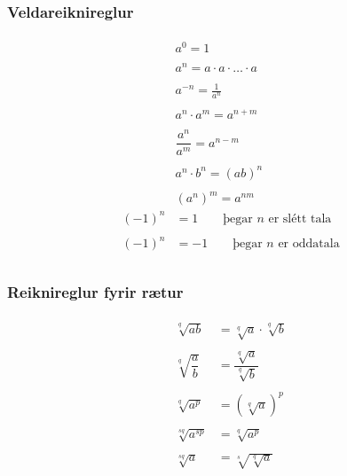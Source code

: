 \documentclass[a4paper,10pt,icelandic]{sphinxmanual}
\begin{document}
\subsubsection{Veldareiknireglur}
\label{\detokenize{Kafli12:veldareiknireglur}}\begin{equation*}
\begin{split}    \begin{aligned}
&a^0=1\\
\qquad \\
&a^n=a \cdot a \cdot \dots \cdot a \\
\qquad \\
    &a^{-n}=\frac{1}{a^n} \\
\qquad \\
&a^n\cdot a^m=a^{n+m}\\
\qquad \\
    &\dfrac {a^n}{a^m}=a^{n-m}\\
\qquad \\
    &a^n\cdot b^n=(ab)^n\\
\qquad \\
    &(a^n)^m=a^{nm}
\qquad \\
(-1)^n &= 1 \qquad \text{þegar } n \text{ er slétt tala} \\
\qquad \\
    (-1)^n &= -1 \qquad \text{þegar } n \text{ er oddatala} \\
    \end{aligned}\end{split}
\end{equation*}

\subsubsection{Reiknireglur fyrir rætur}
\label{\detokenize{Kafli12:reiknireglur-fyrir-raetur}}\begin{equation*}
\begin{split}      \begin{aligned}
        \sqrt[q]{ab} &=\sqrt[q]{a}\cdot \sqrt[q]{b} \\
  & \qquad \\
  \sqrt[q]{\dfrac ab}& =\dfrac{\sqrt[q]{a}}{\sqrt[q] {b}}\\
  & \qquad \\
  \sqrt[q]{a^p}& =(\sqrt[q]{a})^p\\
  & \qquad \\
  \sqrt[sq]{a^{sp}} &={\sqrt[q]{a^p}}\\
  & \qquad \\
  \sqrt[sq]{ a} &=\sqrt[s]{\sqrt[q]{a}}\\
\end{aligned}\end{split}
\end{equation*}
\end{document}
